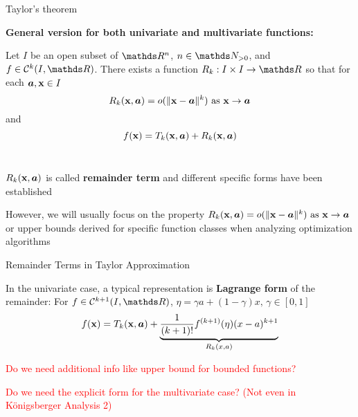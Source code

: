 \documentclass[11pt,compress,t,notes=noshow, xcolor=table]{beamer}
\begin{document}
\begin{framei}{Taylor's theorem}
    \item[] \textbf{General version for both univariate and multivariate functions:}

    Let $I$ be an open subset of $\R^n$, $n\in\N_{>0}$, and $f \in \mathcal{C}^k(I,\R)$.
    There exists a function $R_k:I\times I\rightarrow \R$ so that for each $\bm{a},\mathbf{x} \in I$
    $$
    R_k(\mathbf{x}, \bm{a}) = {o}(\|\mathbf{x}-\bm{a}\|^k) \text{ as } \mathbf{x} \to \bm{a}
    $$
    and 
    $$
    f(\mathbf{x}) =T_k(\mathbf{x}, \bm{a})+ R_k(\mathbf{x}, \bm{a})
    $$\,\\

    \item $R_k(\mathbf{x}, \bm{a})$ is called \textbf{remainder term} and different specific forms have been established
    \item However, we will usually focus on the property $R_k(\mathbf{x}, \bm{a}) = {o}(\|\mathbf{x}-\bm{a}\|^k) \text{ as } \mathbf{x} \to \bm{a}$ or upper bounds derived for specific function classes when analyzing optimization algorithms
\end{framei}


\begin{framei}{Remainder Terms in Taylor Approximation}

    \item In the univariate case, a typical representation is \textbf{Lagrange form} of the remainder: For $f \in \mathcal{C}^{k+1}(I,\R)$, $\eta = \gamma a + (1-\gamma)x, \, \gamma\in[0,1]$
    $$
    f(\mathbf{x}) =T_k(\mathbf{x}, \bm{a})+ \underbrace{\frac{1}{(k+1)!} f^{(k+1)}(\eta)(x-a)^{k+1}}_{R_k(x, a)}
    $$
    \textcolor{red}{
    \item Do we need additional info like upper bound for bounded functions?
    \item Do we need the explicit form for the multivariate case? (Not even in Königsberger Analysis 2)
    }
\end{framei}
\end{document}
